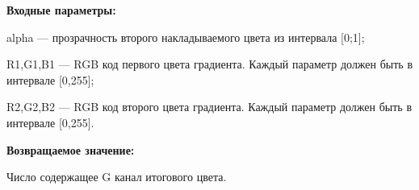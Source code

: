 \textbf{Входные параметры:}  

alpha --- прозрачность второго накладываемого цвета из интервала [0;1];
 
    R1,G1,B1 --- RGB код первого цвета градиента. Каждый параметр должен быть в интервале [0,255];
 
    R2,G2,B2 --- RGB код второго цвета градиента. Каждый параметр должен быть в интервале [0,255].

\textbf{Возвращаемое значение:}

Число содержащее G канал итогового цвета.